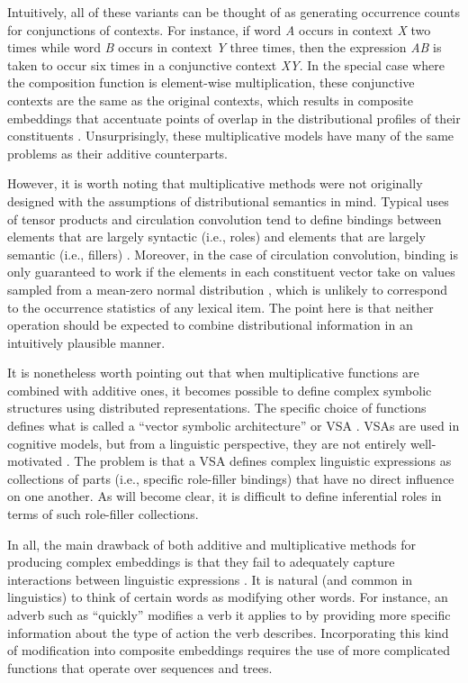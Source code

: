 Intuitively, all of these variants can be thought of as generating occurrence counts for conjunctions of contexts. For instance, if word \textit{A} occurs in context \textit{X} two times while word \textit{B} occurs in context \textit{Y} three times, then the expression \textit{AB} is taken to occur six times in a conjunctive context \textit{XY}. In the special case where the composition function is element-wise multiplication, these conjunctive contexts are the same as the original contexts, which results in composite embeddings that accentuate points of overlap in the distributional profiles of their constituents \citep{Baroni:2014,Mitchell:2010}. Unsurprisingly, these multiplicative models have many of the same problems as their additive counterparts.

However, it is worth noting that multiplicative methods were not originally designed with the assumptions of distributional semantics in mind. Typical uses of tensor products and circulation convolution tend to define bindings between elements that are largely syntactic (i.e., roles) and elements that are largely semantic (i.e., fillers) \citep{SmolenskyLegendre:2006,Plate:2003}. Moreover, in the case of circulation convolution, binding is only guaranteed to work if the elements in each constituent vector take on values sampled from a mean-zero normal distribution \citep{Plate:2003}, which is unlikely to correspond to the occurrence statistics of any lexical item. The point here is that neither operation should be expected to combine distributional information in an intuitively plausible manner.

It is nonetheless worth pointing out that when multiplicative functions are combined with additive ones, it becomes possible to define complex symbolic structures using distributed representations. The specific choice of functions defines what is called a ``vector symbolic architecture'' or VSA \citep{Gayler:2004}. VSAs are used in cognitive models, but from a linguistic perspective, they are not entirely well-motivated \citep{Eliasmith:2013}. The problem is that a VSA defines complex linguistic expressions as collections of parts (i.e., specific role-filler bindings) that have no direct influence on one another. As will become clear, it is difficult to define inferential roles in terms of such role-filler collections. 

In all, the main drawback of both additive and multiplicative methods for producing complex embeddings is that they fail to adequately capture interactions between linguistic expressions \citep{Baroni:2014}. It is natural (and common in linguistics) to think of certain words as modifying other words. For instance, an adverb such as ``quickly'' modifies a verb it applies to by providing more specific information about the type of action the verb describes. Incorporating this kind of modification into composite embeddings requires the use of more complicated functions that operate over sequences and trees. 

